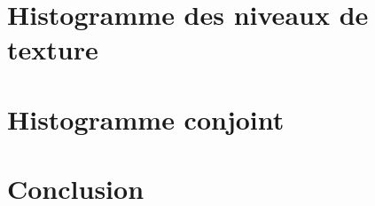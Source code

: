 \documentclass[11pt]{article}
\begin{document}
  \section{Histogramme des niveaux de texture}
  
  \section{Histogramme conjoint}
  
    
  \section*{Conclusion}
\end{document}
